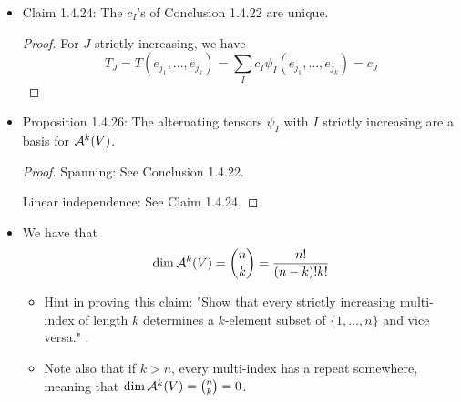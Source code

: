 \documentclass[../notes.tex]{subfiles}
\begin{document}
\begin{itemize}
\begin{proof}
\begin{equation*}
            T = \sum_Ja_Je_J^*
        \end{equation*}
        for some set of $a_J\in\R$. It follows since $\Alt(T)=k!T$ that
        \begin{equation*}
            T = \frac{1}{k!}\sum a_J\Alt(e_J^*)
            = \sum b_J\psi_J
        \end{equation*}
        We can disregard all repeating terms in the sum since they are zero by Proposition 1.4.20(2); for every non-repeating term $J$, we can write $J=I^\sigma$, where $I$ is strictly increasing and hence $\psi_J=(-1)^\sigma\psi_I$.
    \end{proof}
    \item Claim 1.4.24: The $c_I$'s of Conclusion 1.4.22 are unique.
    \begin{proof}
        For $J$ strictly increasing, we have
        \begin{equation*}
            T_J = T(e_{j_1},\dots,e_{j_k})
            = \sum_Ic_I\psi_I(e_{j_1},\dots,e_{j_k})
            = c_J
        \end{equation*}
    \end{proof}
    \item Proposition 1.4.26: The alternating tensors $\psi_I$ with $I$ strictly increasing are a basis for $\alt[k]{V}$.
    \begin{proof}
        Spanning: See Conclusion 1.4.22.\par
        Linear independence: See Claim 1.4.24.
    \end{proof}
    \item We have that
    \begin{equation*}
        \dim\alt[k]{V} = \binom{n}{k}
        = \frac{n!}{(n-k)!k!}
    \end{equation*}
    \begin{itemize}
        \item Hint in proving this claim: "Show that every strictly increasing multi-index of length $k$ determines a $k$-element subset of $\{1,\dots,n\}$ and vice versa." \parencite[16]{bib:DifferentialForms}.
        \item Note also that if $k>n$, every multi-index has a repeat somewhere, meaning that $\dim\alt[k]{V}=\binom{n}{k}=0$.
    \end{itemize}
\end{itemize}
\end{document}
